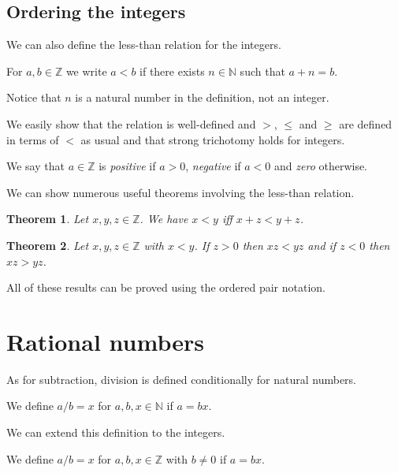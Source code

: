 \documentclass[10pt]{article}
\newcommand{\Z}{\mathbb{Z}}
\newcommand{\N}{\mathbb{N}}
\newtheorem{theorem}{Theorem}[section]
\newenvironment{definition}[1][Definition]{\begin{trivlist}
\item[\hskip \labelsep {\bfseries #1}]}{\end{trivlist}}
\begin{document}
\subsection{Ordering the integers}

We can also define the less-than relation for the integers.

\begin{definition}
For $a, b \in \Z$ we write $a < b$ if there exists $n \in \N$ such that $a + n = b$.
\end{definition}

Notice that $n$ is a natural number in the definition, not an integer.

We easily show that the relation is well-defined and $>$, $\leq$ and $\geq$ are defined in terms of $<$ as usual and that strong trichotomy holds for integers.

\begin{definition}
We say that $a \in \Z$ is \emph{positive} if $a > 0$, \emph{negative} if $a < 0$ and \emph{zero} otherwise.
\end{definition}

We can show numerous useful theorems involving the less-than relation.

\begin{theorem}
Let $x, y, z \in \Z$. We have $x < y$ iff $x + z < y + z$.
\end{theorem}

\begin{theorem}
Let $x, y, z \in \Z$ with $x < y$. If $z > 0$ then $xz < yz$ and if $z < 0$ then $xz > yz$.
\end{theorem}

All of these results can be proved using the ordered pair notation.

\section{Rational numbers}

As for subtraction, division is defined conditionally for natural numbers.

\begin{definition}
We define $a/b = x$ for $a, b, x \in \N$ if $a = bx$.
\end{definition}

We can extend this definition to the integers.

\begin{definition}
We define $a/b = x$ for $a, b, x \in \Z$ with $b \neq 0$ if $a = bx$.
\end{definition}
\end{document}
